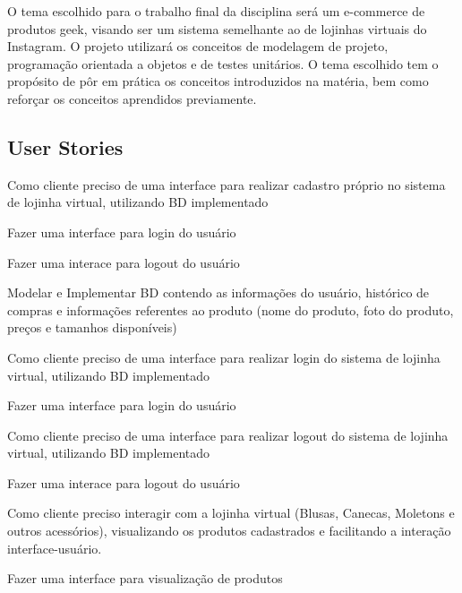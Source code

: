 O tema escolhido para o trabalho final da disciplina será um e-\/commerce de produtos geek, visando ser um sistema semelhante ao de lojinhas virtuais do Instagram. O projeto utilizará os conceitos de modelagem de projeto, programação orientada a objetos e de testes unitários. O tema escolhido tem o propósito de pôr em prática os conceitos introduzidos na matéria, bem como reforçar os conceitos aprendidos previamente.

\subsection*{User Stories}


\begin{DoxyItemize}
\item Como cliente preciso de uma interface para realizar cadastro próprio no sistema de lojinha virtual, utilizando BD implementado
\begin{DoxyItemize}
\item Fazer uma interface para login do usuário
\item Fazer uma interace para logout do usuário
\item Modelar e Implementar BD contendo as informações do usuário, histórico de compras e informações referentes ao produto (nome do produto, foto do produto, preços e tamanhos disponíveis)
\end{DoxyItemize}
\item Como cliente preciso de uma interface para realizar login do sistema de lojinha virtual, utilizando BD implementado
\begin{DoxyItemize}
\item Fazer uma interface para login do usuário
\end{DoxyItemize}
\end{DoxyItemize}

Como cliente preciso de uma interface para realizar logout do sistema de lojinha virtual, utilizando BD implementado
\begin{DoxyItemize}
\item Fazer uma interace para logout do usuário
\end{DoxyItemize}

Como cliente preciso interagir com a lojinha virtual (Blusas, Canecas, Moletons e outros acessórios), visualizando os produtos cadastrados e facilitando a interação interface-\/usuário.
\begin{DoxyItemize}
\item Fazer uma interface para visualização de produtos
\end{DoxyItemize}

